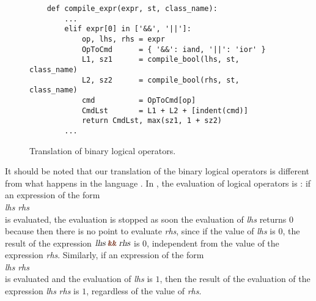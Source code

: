 \begin{figure}[!ht]
\centering
\begin{verbatim}
    def compile_expr(expr, st, class_name):
        ...
        elif expr[0] in ['&&', '||']:
            op, lhs, rhs = expr
            OpToCmd      = { '&&': iand, '||': 'ior' }
            L1, sz1      = compile_bool(lhs, st, class_name)
            L2, sz2      = compile_bool(rhs, st, class_name)
            cmd          = OpToCmd[op]
            CmdLst       = L1 + L2 + [indent(cmd)]
            return CmdLst, max(sz1, 1 + sz2)
        ...
\end{verbatim}
\vspace*{-0.3cm}
\caption{Translation of binary logical operators.}
\label{fig:Compiler.ipynb:compile:iand}
\end{figure}

It should be noted that our translation of the binary logical operators is different from
what happens in the language .  In , the evaluation of logical operators is :
if an expression of the form
\\[0.2cm]
\hspace*{1.3cm}
\textsl{lhs} \mytt{\&\&} \textsl{rhs}
\\[0.2cm]
is evaluated, the evaluation is stopped as soon the evaluation of \textsl{lhs}
returns $0$ because then there is no point to evaluate \textsl{rhs}, since if the value of \textsl{lhs} is $0$,
the result of the expression $\textsl{lhs} \;\mytt{\&\&}\; \textsl{rhs}$ is $0$, independent from the value of
the expression \textsl{rhs}.  Similarly, if an expression of the form 
\\[0.2cm]
\hspace*{1.3cm}
\textsl{lhs} \mytt{||} \textsl{rhs}
\\[0.2cm]
is evaluated and the evaluation of \textsl{lhs} is $1$, then the result of the evaluation of the expression
\textsl{lhs} \mytt{||} \textsl{rhs} is $1$, regardless of the value of \textsl{rhs}.

